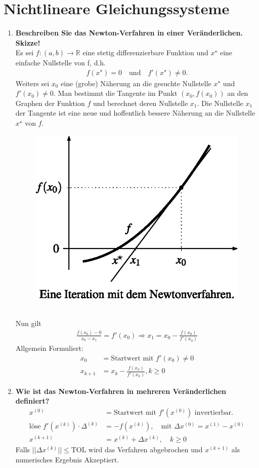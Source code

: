 \section{Nichtlineare Gleichungssysteme}
	\begin{enumerate}
		\item \textbf{Beschreiben Sie das Newton-Verfahren in einer Veränderlichen. Skizze!} \\
			Es sei \(f:(a,b)\rightarrow\mathbb{R}\) eine stetig differenzierbare Funktion und \(x^\star\) eine einfache Nullstelle von f, d.h.
			\begin{align*}
				f(x^\star)=0 \quad \text{und} \quad f'(x^\star)\neq 0.
			\end{align*}
			Weiters sei \(x_0\) eine (grobe) Näherung an die gesuchte Nullstelle \(x^\star\) und \(f'(x_0)\neq 0\).
			Man bestimmt die Tangente im Punkt \((x_0,f(x_0))\) an den Graphen der Funktion \(f\) und berechnet deren Nullstelle \(x_1\). Die Nullstelle \(x_1\) der Tangente ist eine neue und hoffentlich bessere Näherung an die Nullstelle \(x^\star\) von \(f\).
			\begin{figure}[htbp]
				\centering
				\includegraphics[width=0.35\linewidth]{Kap6_1}
			\end{figure}\\
			Nun gilt 
			\begin{align*}
				\frac{f(x_0)-0}{x_0-x_1}=f'(x_0) \Rightarrow x_1=x_0-\frac{f(x_0)}{f'(x_0)}
			\end{align*}
			Allgemein Formuliert:
			\begin{align*}
				x_0 &= \text{Startwert mit } f'(x_0)\neq 0 \\
				x_{k+1} &= x_k-\frac{f(x_k)}{f'(x_k)}, k\geq0
			\end{align*}
		\item \textbf{Wie ist das Newton-Verfahren in mehreren Veränderlichen definiert?}
			\begin{align*}
				x^{(0)} &= \text{Startwert mit } f'(x^{(0)}) \text{ invertierbar.} \\
				\text{löse } f'(x^{(k)})\cdot \Delta^{(k)} &= -f(x^{(k)}), \quad \text{mit } \Delta x^{(0)}=x^{(1)}-x^{(0)} \\
				x^{(k+1)} &= x^{(k)} +  \Delta x^{(k)}, \quad k\geq 0
			\end{align*}
			Falls \(||\Delta x^{(k)}||\leq\text{TOL} \) wird das Verfahren abgebrochen und \(x^{(k+1)}\) als numerisches Ergebnis Akzeptiert.
		

\end{enumerate}
